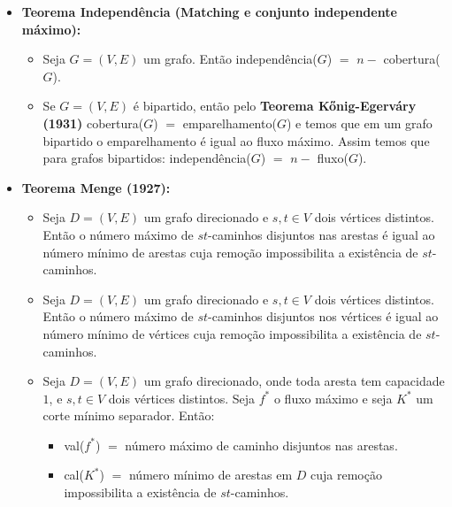 \begin{itemize}
\begin{itemize}
Therefore, the size of the minimum cut is equal to 
$\displaystyle |A_{T}|+|B_{S}|$. On the other hand, 
$\displaystyle A_{T}\cup B_{S}$ is a vertex cover, as any edge that is not incident to vertices from 
$\displaystyle A_{T}$ and
$\displaystyle B_{S}$ must be incident to a pair of vertices from 
$\displaystyle A_{S}$ and 
$\displaystyle B_{T}$, which would contradict the fact that there are no edges between 
$\displaystyle A_{S}$ and 
$\displaystyle B_{T}$.
Thus, 
$\displaystyle A_{T}\cup B_{S}$ is a minimum vertex cover of 
$\displaystyle G$.
\item basically just check if the cut was on a edge related to $S$ or to $T$.
        \end{itemize}
        \item \textbf{Teorema Independência (Matching e conjunto independente máximo):}
        \begin{itemize}
            \item Seja $G=(V, E)$ um grafo. Então independência($G$) $=$ $n - $ cobertura($G$).
            \item Se $G = (V,E)$ é bipartido, então pelo \textbf{Teorema Kőnig-Egerváry (1931)} cobertura($G$) $=$ emparelhamento($G$) e temos que em um grafo bipartido o emparelhamento é igual ao fluxo máximo. Assim temos que para grafos bipartidos: independência($G$) $=$ $n - $ fluxo($G$).
        \end{itemize}
        \item \textbf{Teorema Menge (1927):}
        \begin{itemize}
            \item Seja $D=(V, E)$ um grafo direcionado e $s,t \in V$ dois vértices distintos. Então o número máximo de $st$-caminhos disjuntos nas arestas é igual ao número mínimo de arestas cuja remoção impossibilita a existência de $st$-caminhos.
            \item Seja $D=(V, E)$ um grafo direcionado e $s,t \in V$ dois vértices distintos. Então o número máximo de $st$-caminhos disjuntos nos vértices é igual ao número mínimo de vértices cuja remoção impossibilita a existência de $st$-caminhos.
            \item Seja $D=(V, E)$ um grafo direcionado, onde toda aresta tem capacidade $1$, e $s,t \in V$ dois vértices distintos. Seja $f^*$ o fluxo máximo e seja $K^*$ um corte mínimo separador. Então:
            \begin{itemize}
                \item val($f^*$) $=$ número máximo de caminho disjuntos nas arestas.
                \item cal($K^*$) $=$ número mínimo de arestas em $D$ cuja remoção impossibilita a existência de $st$-caminhos.
            \end{itemize}
        \end{itemize}
    \end{itemize}

